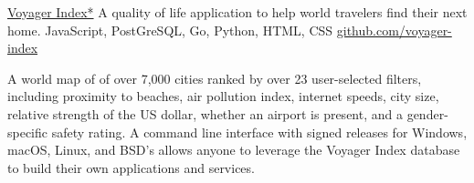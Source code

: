 \showoff
{\href{voyager-index.herokuapp.com}{Voyager Index*}}
{A quality of life application to help world travelers find their next home.}
{JavaScript, PostGreSQL, Go, Python, HTML, CSS}
{\href{https://github.com/voyager-index/}{github.com/voyager-index}}

A world map of of over 7,000 cities ranked by over 23 user-selected filters, including proximity to beaches, air pollution index, internet speeds, city size, relative strength of the US dollar, whether an airport is present, and a gender-specific safety rating. A command line interface with signed releases for Windows, macOS, Linux, and BSD’s allows anyone to leverage the Voyager Index database to build their own applications and services.

\myBreak

